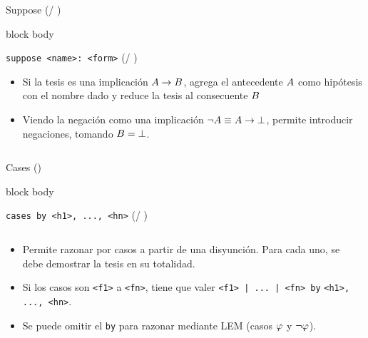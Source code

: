 \documentclass[xcolor={dvipsnames},spanish]{beamer}
\newenvironment{command}
    {
        \begin{beamercolorbox}[sep=8pt,center,shadow=true,rounded=true]{block body}
    }
    {\end{beamercolorbox}}
\begin{document}
\begin{frame}[fragile]{Suppose ( / )}
    \begin{command}
        \lstinline{suppose <name>: <form>} \quad ( / )
    \end{command}

    \begin{itemize}
        \item  Si la tesis es una implicación $A \to B$, agrega el antecedente
        $A$ como hipótesis con el nombre dado y reduce la tesis al consecuente
        $B$
        \item Viendo la negación como una implicación $\neg A \equiv
        A \to \bot$, permite introducir negaciones, tomando
        $B = \bot$.
    \end{itemize}

    \begin{columns}
        \begin{column}{0.5\textwidth}
            
        \end{column}
        \begin{column}{0.5\textwidth}
                
        \end{column}
    \end{columns}
\end{frame}

\begin{frame}[fragile]{Cases ()}
    \begin{command}
        \lstinline{cases by <h1>, ..., <hn>} \quad ( / )
    \end{command}
    \begin{columns}
        \begin{column}{0.5\textwidth}
        \begin{itemize}
            \item Permite razonar por casos a partir de una disyunción. Para cada uno, se debe
            demostrar la tesis en su totalidad.
            \item Si los casos son \lstinline{<f1>} a
            \lstinline{<fn>}, tiene que valer \lstinline{<f1> | ... | <fn> by} \lstinline{<h1>, ..., <hn>}.
            \item Se puede omitir el \lstinline{by} para razonar mediante LEM (casos $\varphi$ y $\neg \varphi$).
        \end{itemize}
        \end{column}
        \begin{column}{0.5\textwidth}
            
        \end{column}
    \end{columns}
\end{frame}
\end{document}
